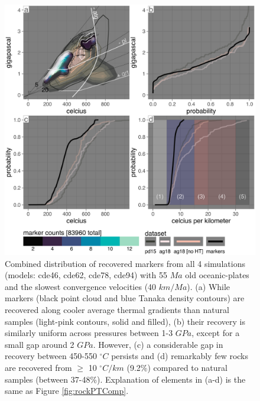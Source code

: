 \begin{figure}[htbp]

{\centering \includegraphics[width=1\linewidth,]{assets/figs/chpt4/marx_comp_older_slow} 

}

\caption[Recovery rates for all 4 subduction simulations with the youngest oceanic-plates and slowest convergence velocities]{Combined distribution of recovered markers from all 4 simulations (models: cde46, cde62, cde78, cde94) with 55 \(Ma\) old oceanic-plates and the slowest convergence velocities (40 \(km/Ma\)). (a) While markers (black point cloud and blue Tanaka density contours) are recovered along cooler average thermal gradients than natural samples (light-pink contours, solid and filled), (b) their recovery is similarly uniform across pressures between 1-3 \(GPa\), except for a small gap around 2 \(GPa\). However, (c) a considerable gap in recovery between 450-550 \(^\circ C\) persists and (d) remarkably few rocks are recovered from \(\geq\) 10 \(^\circ C/km\) (9.2\%) compared to natural samples (between 37-48\%). Explanation of elements in (a-d) is the same as Figure \ref{fig:rockPTComp}.}\label{fig:olderSlow}
\end{figure}

